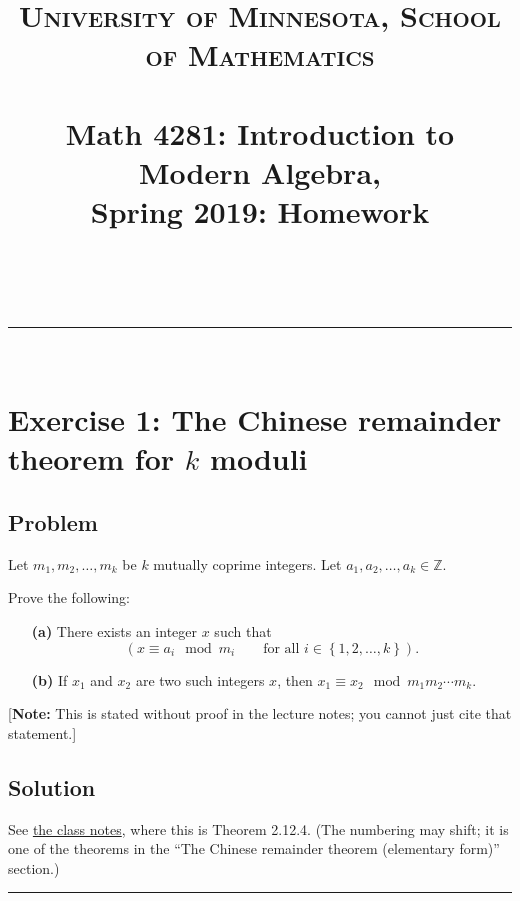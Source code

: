 \documentclass[paper=a4, fontsize=12pt]{scrartcl} %
\title{	
\normalfont \normalsize 
\textsc{University of Minnesota, School of Mathematics} \\ [25pt] %
\horrule{0.5pt} \\[0.4cm] %
\huge Math 4281: Introduction to Modern Algebra, \\
Spring 2019:
Homework \psetnumber\\%
\horrule{2pt} \\[0.5cm] %
}
\author{\myname}
\newcommand{\ZZ}{\mathbb{Z}} %
\newcommand{\set}[1]{\left\{ #1 \right\}}
\newcommand{\tup}[1]{\left( #1 \right)}
\newcommand{\horrule}[1]{\rule{\linewidth}{#1}} %
\theoremstyle{plainsl}
\theoremstyle{definition}
\theoremstyle{remark}
\begin{document}
\maketitle %

\horrule{0.3pt} \\[0.4cm]

\section{Exercise 1: The Chinese remainder theorem for $k$ moduli}

\subsection{Problem}

Let $m_1, m_2, \ldots, m_k$ be $k$ mutually coprime integers.
Let $a_1, a_2, \ldots, a_k \in \ZZ$.

Prove the following:

\begin{enumerate}

\item[\textbf{(a)}]
There exists an integer $x$ such that
\[
\tup{ x \equiv a_i \mod m_i \qquad \text{for all } i \in \set{1, 2, \ldots, k} } .
\]

\item[\textbf{(b)}]
If $x_1$ and $x_2$ are two such integers $x$, then
$x_1 \equiv x_2 \mod m_1 m_2 \cdots m_k$.

\end{enumerate}

[\textbf{Note:} This is stated without proof in the lecture notes;
you cannot just cite that statement.]

\subsection{Solution}

See
\href{http://www.cip.ifi.lmu.de/~grinberg/t/19s/notes.pdf}{the class notes},
where this is Theorem 2.12.4. (The numbering may shift; it is one of the
theorems in the
``The Chinese remainder theorem (elementary form)''
section.)

\horrule{0.3pt} \\[0.4cm]
\end{document}
